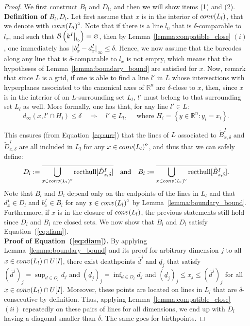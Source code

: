 \documentclass[10pt,a4paper]{amsart}
\newcommand\restr[2]{{  \left.\kern-\nulldelimiterspace #1 \vphantom{\big|} \right|_{#2}  }}
\newcommand{\R}{\mathbb{R}}
\newcommand{\barcode}[1]{ {\mathcal B}\left(#1\right) }
\newcommand{\conv}[1]{ {\rm conv}(#1) }
\newcommand{\field}{k}
\newcommand{\induced}[1]{\field^{#1}}
\newcommand{\interior}[1]{{\kern0pt#1}^{\mathrm{o}}}
\begin{document}
\begin{proof} We first construct $B_l$ and $D_l$, and then we will show items (1) and (2). \\

	{\bf Definition of $B_l,D_l$.}
	Let first assume that $x$ is in the interior of $ \conv{L_l}$, that we denote with $\interior{\conv{L_l}}$.
	Note that if there is a line $l_0$ that is $\delta$-comparable to $l_x$, and such that $\barcode{\restr{\induced{I}}{l_0}} = \varnothing$,  %
	then by Lemma~\ref{lemma:compatible_close} $(i)$, one immediately has $\Vert b_x^I - d_x^I \Vert_{\infty} \le \delta$.
	Hence, we now assume that the barcodes along any %
	line that is $\delta$-comparable to $l_x$ is not empty,
	which means that the hypotheses
	of Lemma~\ref{lemma:boundary_bound} are satisfied for $x$.
	Now, remark that since $L$ is a grid, if one is able to find a line $l'$ in $L$ whose intersections
	with hyperplanes associated to the canonical axes of $\R^n$ are $\delta$-close to $x$, then, since $x$
	is in the interior of an $L$-surrounding set $L_l$, $l'$ must belong to that surrounding set $L_l$ as well. More formally,
	one has that, for any line $l'\in L$:
	\begin{equation*}
		d_{\infty}(x, l'\cap H_i)\le \delta \quad\Longrightarrow\quad l' \in L_l,
		\quad
		\text{ where }
		H_i = \left\{ y \in \R^n : y_i = x_i\right\}.
	\end{equation*}

	This ensures (from Equation~\ref{eq:surr}) that the lines of $L$ associated to $\tilde B^I_{x,\delta}$ and  $\tilde D^I_{x,\delta}$
	are all included in $L_l$ for any $x\in\interior{\conv{L_l}}$, and thus that we can safely define:
	\begin{equation*}
		D_l := \overline{\bigcup_{x \in \interior{\conv{L_l}}}\mathrm{ recthull}[\tilde D_{x,\delta}^I]}
		\quad \text{and} \quad
		B_l := \overline{\bigcup_{x \in \interior{\conv{L_l}}}\mathrm{ recthull}[\tilde B_{x,\delta}^I] }.
	\end{equation*}
	Note that $B_l$ and $D_l$ depend only on the endpoints of the lines in $L_l$ %
	and that $d_x^I \in D_l$ and $b_x^I \in B_l$ for any $x\in \interior{\conv{L_l}}$ by Lemma~\ref{lemma:boundary_bound}.
	Furthermore, if $x$ is in the closure of $\conv{L_l}$, the previous statements still hold
	since $D_l$ and $B_l$ are closed sets.
	We now show that $B_l$ and $D_l$ satisfy Equation~(\ref{eq:diam}). \\

	{\bf Proof of Equation~(\ref{eq:diam}). } By applying
	Lemma~\ref{lemma:boundary_bound} and its proof for arbitrary dimension $j$ to all $x\in\conv{L_l}\cap U[I]$, %
	there exist deathpoints $\overline d^j$ and $\underline d_j$
	that satisfy $(\overline d^j)_j = \sup_{d\in D_l} d_j$ and $(\underline d_j)_j = \inf_{d\in D_l} d_j$ and $(\underline d_j)_j \le x_j \le (\overline d^j)_j$ for all $x\in\conv{L_l}\cap U[I]$.
	Moreover, these points are located on lines in $L_l$
	that are $\delta$-consecutive by definition.
	Thus, applying Lemma~\ref{lemma:compatible_close} $(ii)$ repeatedly on these
	pairs of lines for all dimensions, we end up with $D_l$ having a diagonal smaller than $\delta$. The same goes for birthpoints. %
\end{proof}
\end{document}
